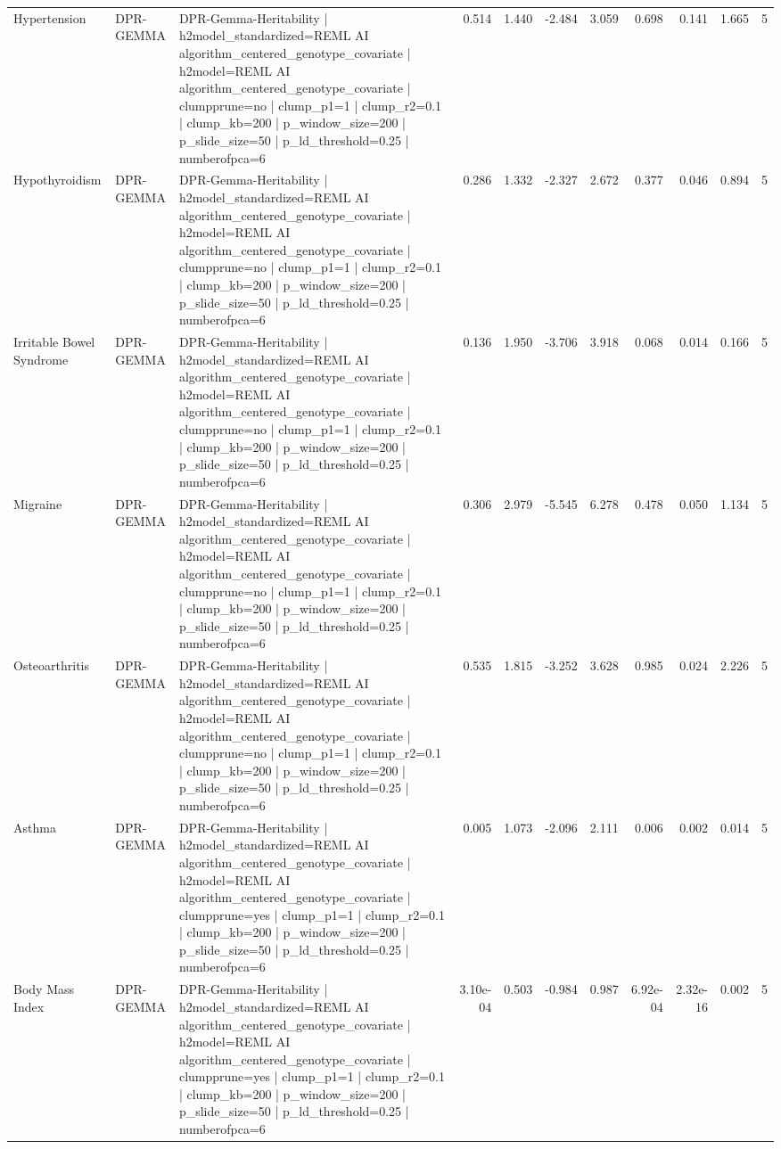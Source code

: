 \begin{landscape}
\begin{longtable}{p{2.4cm}p{1.8cm}p{6.0cm}rrrrrrrr}
Hypertension & DPR-GEMMA & DPR-Gemma-Heritability | h2model\_standardized=REML AI algorithm\_centered\_genotype\_covariate | h2model=REML AI algorithm\_centered\_genotype\_covariate | clumpprune=no | clump\_p1=1 | clump\_r2=0.1 | clump\_kb=200 | p\_window\_size=200 | p\_slide\_size=50 | p\_ld\_threshold=0.25 | numberofpca=6 & 0.514 & 1.440 & -2.484 & 3.059 & 0.698 & 0.141 & 1.665 & 5 \\
Hypothyroidism & DPR-GEMMA & DPR-Gemma-Heritability | h2model\_standardized=REML AI algorithm\_centered\_genotype\_covariate | h2model=REML AI algorithm\_centered\_genotype\_covariate | clumpprune=no | clump\_p1=1 | clump\_r2=0.1 | clump\_kb=200 | p\_window\_size=200 | p\_slide\_size=50 | p\_ld\_threshold=0.25 | numberofpca=6 & 0.286 & 1.332 & -2.327 & 2.672 & 0.377 & 0.046 & 0.894 & 5 \\
Irritable Bowel Syndrome & DPR-GEMMA & DPR-Gemma-Heritability | h2model\_standardized=REML AI algorithm\_centered\_genotype\_covariate | h2model=REML AI algorithm\_centered\_genotype\_covariate | clumpprune=no | clump\_p1=1 | clump\_r2=0.1 | clump\_kb=200 | p\_window\_size=200 | p\_slide\_size=50 | p\_ld\_threshold=0.25 | numberofpca=6 & 0.136 & 1.950 & -3.706 & 3.918 & 0.068 & 0.014 & 0.166 & 5 \\
Migraine & DPR-GEMMA & DPR-Gemma-Heritability | h2model\_standardized=REML AI algorithm\_centered\_genotype\_covariate | h2model=REML AI algorithm\_centered\_genotype\_covariate | clumpprune=no | clump\_p1=1 | clump\_r2=0.1 | clump\_kb=200 | p\_window\_size=200 | p\_slide\_size=50 | p\_ld\_threshold=0.25 | numberofpca=6 & 0.306 & 2.979 & -5.545 & 6.278 & 0.478 & 0.050 & 1.134 & 5 \\
Osteoarthritis & DPR-GEMMA & DPR-Gemma-Heritability | h2model\_standardized=REML AI algorithm\_centered\_genotype\_covariate | h2model=REML AI algorithm\_centered\_genotype\_covariate | clumpprune=no | clump\_p1=1 | clump\_r2=0.1 | clump\_kb=200 | p\_window\_size=200 | p\_slide\_size=50 | p\_ld\_threshold=0.25 | numberofpca=6 & 0.535 & 1.815 & -3.252 & 3.628 & 0.985 & 0.024 & 2.226 & 5 \\
Asthma & DPR-GEMMA & DPR-Gemma-Heritability | h2model\_standardized=REML AI algorithm\_centered\_genotype\_covariate | h2model=REML AI algorithm\_centered\_genotype\_covariate | clumpprune=yes | clump\_p1=1 | clump\_r2=0.1 | clump\_kb=200 | p\_window\_size=200 | p\_slide\_size=50 | p\_ld\_threshold=0.25 | numberofpca=6 & 0.005 & 1.073 & -2.096 & 2.111 & 0.006 & 0.002 & 0.014 & 5 \\
Body Mass Index & DPR-GEMMA & DPR-Gemma-Heritability | h2model\_standardized=REML AI algorithm\_centered\_genotype\_covariate | h2model=REML AI algorithm\_centered\_genotype\_covariate | clumpprune=yes | clump\_p1=1 | clump\_r2=0.1 | clump\_kb=200 | p\_window\_size=200 | p\_slide\_size=50 | p\_ld\_threshold=0.25 | numberofpca=6 & 3.10e-04 & 0.503 & -0.984 & 0.987 & 6.92e-04 & 2.32e-16 & 0.002 & 5 \\

\end{longtable}
\end{landscape}
